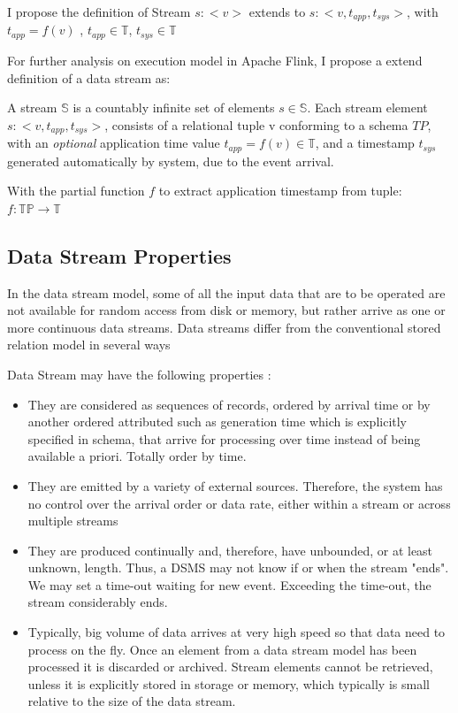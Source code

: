 I propose the definition of Stream $s:<v>$ extends to $s:<v, t_{app}, t_{sys}>$, with $t_{app} = f(v)$ , $t_{app} \in \mathbb{T}$, $t_{sys} \in \mathbb{T}$

For further analysis on execution model in Apache Flink, I propose a extend definition of a data stream as:

\begin{defi}
	A stream $\mathbb{S}$ is a countably infinite set of elements $s \in \mathbb{S}$. Each  stream element $s: <v, t_{app}, t_{sys}>$, consists of a relational tuple v conforming to a schema $TP$, with an \textit{optional} application time value $t_{app} = f(v) \in \mathbb{T}$, and a timestamp $t_{sys}$ generated automatically by system, due to the event arrival.
\end{defi}
With the partial function $f$ to extract application timestamp from tuple: $f: \mathbb{TP} \rightarrow \mathbb{T}$


 
\subsection*{Data Stream Properties} 
In the data stream model, some of all the input data that are to be operated are not available for random access from disk or memory, but rather arrive as one or more continuous data streams. Data streams differ from the conventional stored relation model in several ways\citep{Babcock:2002}


Data Stream may have the following properties \citep{Golab:2010}:
\begin{itemize}
	\item They are considered as sequences of records, ordered by arrival time or by another ordered attributed such as generation time which is explicitly specified in schema, that arrive for processing over time instead of being available a priori. Totally order by time. 
	\item They are emitted by a variety of external sources. Therefore, the system has no control over the arrival order or data rate, either within a stream or across multiple streams
	\item They are produced continually and, therefore, have unbounded, or at least unknown, length. Thus, a DSMS may not know if or when the stream "ends". We may set a time-out waiting for new event. Exceeding the time-out, the stream considerably ends. 
	\item Typically, big volume of data arrives at very high speed so that data need to process on the fly. Once an element from a data stream model has been processed it is discarded or archived. Stream elements cannot be retrieved, unless it is explicitly stored in storage or memory, which typically is small relative to the size of the data stream. \citep{Babcock:2002}
	
\end{itemize}



